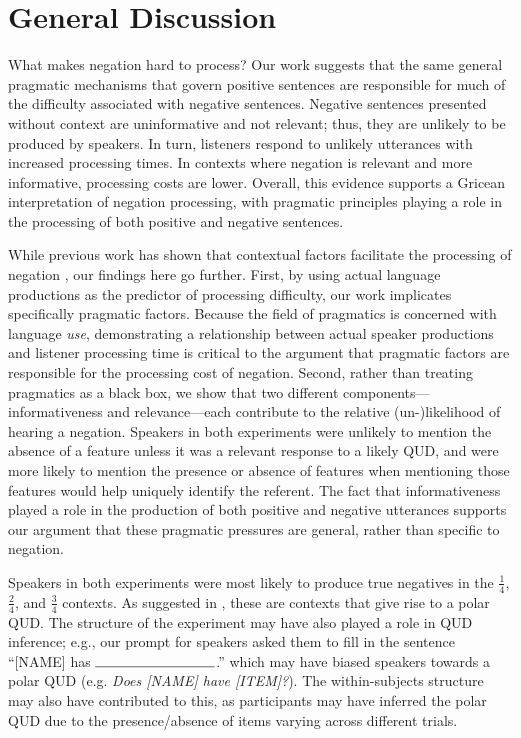 \documentclass[man, floatsintext, noapacite]{apa6}
\begin{document}
\section{General Discussion}

What makes negation hard to process? Our work suggests that the same general pragmatic mechanisms that govern positive sentences are responsible for much of the difficulty associated with negative sentences. Negative sentences presented without context are uninformative and not relevant; thus, they are unlikely to be produced by speakers. In turn, listeners respond to unlikely utterances with increased processing times. In contexts where negation is relevant and more informative, processing costs are lower. Overall, this evidence supports a Gricean interpretation of negation processing, with pragmatic principles playing a role in the processing of both positive and negative sentences.

While previous work has shown that contextual factors facilitate the processing of negation \cite{wason1965,nieuwland2008,dale2011,orenes2014}, our findings here go further. First, by using actual language productions as the predictor of processing difficulty, our work implicates specifically pragmatic factors. Because the field of pragmatics is concerned with language \textit{use}, demonstrating a relationship between actual speaker productions and listener processing time is critical to the argument that pragmatic factors are responsible for the processing cost of negation. Second, rather than treating pragmatics as a black box, we show that two different components---informativeness and relevance---each contribute to the relative (un-)likelihood of hearing a negation. Speakers in both experiments were unlikely to mention the absence of a feature unless it was a relevant response to a likely QUD, and were more likely to mention the presence or absence of features when mentioning those features would help uniquely identify the referent. The fact that informativeness played a role in the production of both positive and negative utterances supports our argument that these pragmatic pressures are general, rather than specific to negation. 

Speakers in both experiments were most likely to produce true negatives in the $\frac{1}{4}$, $\frac{2}{4}$, and $\frac{3}{4}$ contexts. As suggested in , these are contexts that give rise to a polar QUD. The structure of the experiment may have also played a role in QUD inference; e.g., our prompt for speakers asked them to fill in the sentence ``[NAME] has $\rule{3cm}{0.15mm}$.'' which may have biased speakers towards a polar QUD (e.g. \textit{Does [NAME] have [ITEM]?}). The within-subjects structure may also have contributed to this, as participants may have inferred the polar QUD due to the presence/absence of items varying across different trials.
\end{document}
